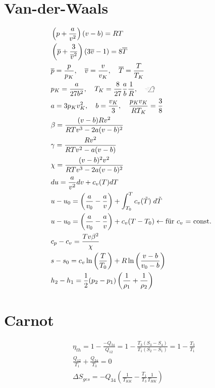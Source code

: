 \documentclass[twocolumn]{article}
\begin{document}
\section{Van-der-Waals}
\begin{align*}
	&\left(p + \frac{a}{v^2}\right)(v-b) = RT 
	\\
	&\left(\overline{p} + \frac{3}{\overline{v}^2}\right)(3\overline{v}-1) = 8\overline{T} 
	\\
	&\overline{p} = \frac{p}{p_K}, \quad \overline{v} = \frac{v}{v_K}, \quad \overline{T} = \frac{T}{T_K} 
	\\
	&p_K = \frac{a}{27b^2}, \quad T_K = \frac{8}{27}\frac{a}{b}\frac{1}{R}, \quad \xrightswishingghost{} 
	\\
	&a=3p_Kv^2_K, \quad b =\frac{v_K}{3}, \quad \frac{p_Kv_K}{RT_K} = \frac{3}{8} 
	\\
	&\beta = \frac{(v-b)Rv^2}{RTv^3 - 2a(v-b)^2} 
	\\ 
	&\gamma = \frac{Rv^2}{RTv^2 - a(v-b)} 
	\\
	&\chi = \frac{(v-b)^2v^2}{RTv^3 - 2a(v-b)^2} 
	\\
	& du = \frac{a}{v^2}dv + c_v(T)dT 
	\\
	&u-u_0 = \left( \frac{a}{v_0} - \frac{a}{v} \right) + \int_{T_0}^{T} c_v(\tilde{T})\; d\tilde{T} 
	\\
	& u - u_0 = \left(\frac{a}{v_0} - \frac{a}{v} \right) + c_v(T-T_0) \leftarrow \text{für $c_v$ = const.} 
	\\
	&c_p - c_v = \frac{Tv\beta^2}{\chi} 
	\\
	& s- s_0 = c_v \ln \left( \frac{T}{T_0} \right) + R \ln \left(\frac{v-b}{v_0 - b} \right)
	\\
	& h_2 - h_1 = \frac{1}{2}(p_2 - p_1) \left( \frac{1}{\rho_1} + \frac{1}{\rho_2}\right)
	\\
\end{align*}
\bigskip
\bigskip
\bigskip
\bigskip
\pagebreak


\section{Carnot}

\begin{align*}
	&\eta_{th} = 1 - \frac{-Q_{34}}{Q_{12}} 
	= 1 - \frac{T_3(S_3-S_4)}{T_1(S_2 - S_1)} 
	= 1 - \frac{T_3}{T_1} \\
	&\frac{Q_{12}}{T_1} + \frac{Q_{34}}{T_3} 
	= 0 \\
	&\Delta S_{ges} 
	= -Q_{34} \left( \frac{1}{T_{KK}} 
	- \frac{T_1}{T_3}\frac{1}{T_{HK}} \right)
\end{align*}
\end{document}

